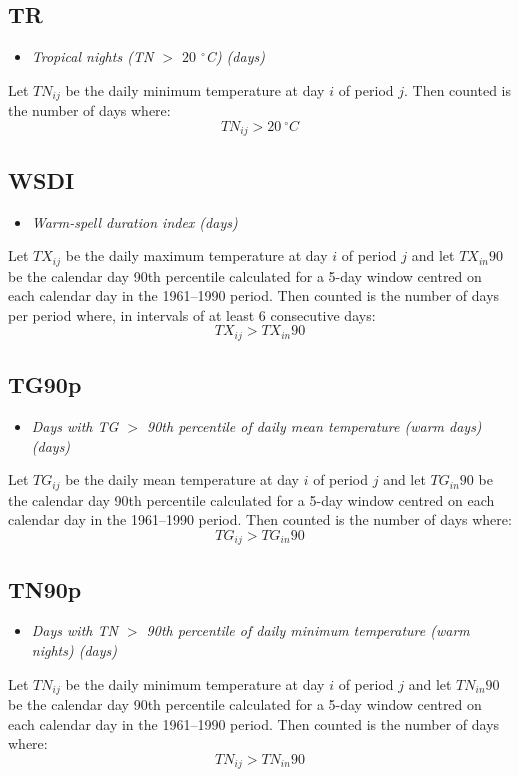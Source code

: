 \documentclass[a4paper,11pt]{article}
\begin{document}
\subsection*{TR}
\begin{itemize}
\item \textit{Tropical nights (TN $>$ $20$ $^\circ$C) (days)}
\end{itemize}
Let $TN_{ij}$ be the daily minimum temperature at day $i$ of period
$j$. Then counted is the number of days where:
\begin{equation*}
TN_{ij} > 20 \:^\circ C
\end{equation*}

\subsection*{WSDI}
\begin{itemize}
\item \textit{Warm-spell duration index (days)}
\end{itemize}
Let $TX_{ij}$ be the daily maximum temperature at day $i$ of period
$j$ and let $TX_{in}90$ be the calendar day 90th percentile calculated
for a 5-day window centred on each calendar day in the 1961--1990
period. Then counted is the number of days per period where, in
intervals of at least 6 consecutive days:
\begin{equation*}
TX_{ij} > TX_{in}90
\end{equation*}

\subsection*{TG90p}
\begin{itemize}
\item \textit{Days with TG $>$ 90th percentile of daily mean temperature
(warm days) (days)}
\end{itemize}
Let $TG_{ij}$ be the daily mean temperature at day $i$ of period $j$
and let $TG_{in}90$ be the calendar day 90th percentile calculated for
a 5-day window centred on each calendar day in the 1961--1990
period. Then counted is the number of days where:
\begin{equation*}
TG_{ij} > TG_{in}90
\end{equation*}

\subsection*{TN90p}
\begin{itemize}
\item \textit{Days with TN $>$ 90th percentile of daily minimum
temperature (warm nights) (days)}
\end{itemize}
Let $TN_{ij}$ be the daily minimum temperature at day $i$ of period
$j$ and let $TN_{in}90$ be the calendar day 90th percentile calculated
for a 5-day window centred on each calendar day in the 1961--1990
period. Then counted is the number of days where:
\begin{equation*}
TN_{ij} > TN_{in}90
\end{equation*}
\end{document}
